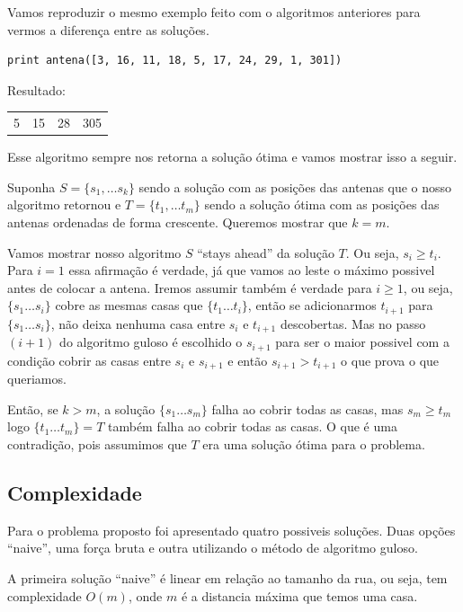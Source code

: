 \documentclass[11pt]{article}
\begin{document}
Vamos reproduzir o mesmo exemplo feito com o algoritmos anteriores
para vermos a diferença entre as soluções.

\begin{verbatim}
print antena([3, 16, 11, 18, 5, 17, 24, 29, 1, 301])
\end{verbatim}

Resultado:
\begin{center}
\begin{tabular}{rrrr}
5 & 15 & 28 & 305\\
\end{tabular}
\end{center}

Esse algoritmo sempre nos retorna a solução ótima e vamos mostrar isso
a seguir.

Suponha $S = \{ s_1, \ldots s_k \}$ sendo a solução com as posições
das antenas que o nosso algoritmo retornou e $T = \{ t_1, \ldots t_m
\}$ sendo a solução ótima com as posições das antenas ordenadas de
forma crescente. Queremos mostrar que $k=m$.

Vamos mostrar nosso algoritmo $S$ ``stays ahead'' da solução $T$. Ou
seja, $s_i \geq t_i$.  Para $i = 1$ essa afirmação é verdade, já que
vamos ao leste o máximo possivel antes de colocar a antena.  Iremos
assumir também é verdade para $i \geq 1$, ou seja, $\{ s_1 \ldots s_i
\}$ cobre as mesmas casas que $\{ t_1 \ldots t_i \}$, então se
adicionarmos $t_{i+1}$ para $\{ s_1 \ldots s_i \}$, não deixa nenhuma
casa entre $s_i$ e $t_{i+1}$ descobertas.  Mas no passo $(i+1)$ do
algoritmo guloso é escolhido o $s_{i+1}$ para ser o maior possivel com
a condição cobrir as casas entre $s_i$ e $s_{i+1}$ e então $s_{i+1} >
t_{i+1}$ o que prova o que queriamos.

Então, se $k>m$, a solução $\{ s_1 \ldots s_m \}$ falha ao cobrir
todas as casas, mas $s_m \geq t_m$ logo $\{ t_1 \ldots t_m \} = T$
também falha ao cobrir todas as casas. O que é uma contradição, pois
assumimos que $T$ era uma solução ótima para o problema.


\subsection{Complexidade}
\label{sec-5-4}
\label{sec-5}

Para o problema proposto foi apresentado quatro possiveis
soluções. Duas opções ``naive'', uma força bruta e outra utilizando o
método de algoritmo guloso.

A primeira solução ``naive'' é linear em relação ao tamanho da rua, ou
seja, tem complexidade $O(m)$, onde $m$ é a distancia máxima que temos
uma casa.
\end{document}
